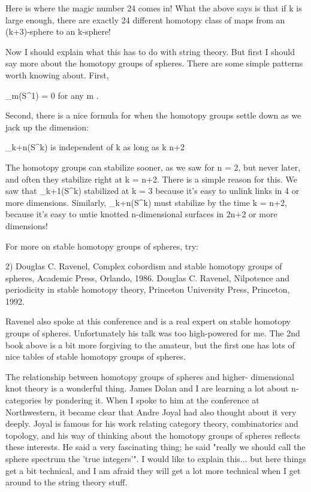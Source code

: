 Here is where the magic number 24 comes in!  What the above says
is that if k is large enough, there are exactly 24 different homotopy
class of maps from an (k+3)-sphere to an k-sphere!  

Now I should explain what this has to do with string theory.  But first
I should say more about the homotopy groups of spheres.  There are some
simple patterns worth knowing about.  First,

\pi _{m}(S^{1}) = {0}         for any m .

Second, there is a nice formula for when the homotopy groups settle
down as we jack up the dimension:

\pi _{k+n}(S^{k})   is independent of k as long as k \ge  n+2

The homotopy groups can stabilize sooner, as we saw for n = 2, but never
later, and often they stabilize right at k = n+2.  There is a simple
reason for this.  We saw that \pi _{k+1}(S^{k}) stabilized at k = 3 because
it's easy to unlink links in 4 or more dimensions.  Similarly,
\pi _{k+n}(S^{k}) must stabilize by the time k = n+2, because it's easy to
untie knotted n-dimensional surfaces in 2n+2 or more dimensions!

For more on stable homotopy groups of spheres, try:

2) Douglas C. Ravenel, Complex cobordism and stable homotopy groups of
spheres, Academic Press, Orlando, 1986. 
Douglas C. Ravenel, Nilpotence and periodicity in stable homotopy
theory, Princeton University Press, Princeton, 1992.  

Ravenel also spoke at this conference and is a real expert on stable
homotopy groups of spheres.  Unfortunately his talk was too high-powered
for me.  The 2nd book above is a bit more forgiving to the amateur,
but the first one has lots of nice tables of stable homotopy groups
of spheres.   

The relationship between homotopy groups of spheres and higher-
dimensional knot theory is a wonderful thing.  James Dolan and I are
learning a lot about n-categories by pondering it.  When I spoke to
him at the conference at Northwestern, it became clear that Andre
Joyal had also thought about it very deeply.  Joyal is famous for his
work relating category theory, combinatorics and topology, and his way
of thinking about the homotopy groups of spheres reflects these
interests.  He said a very fascinating thing; he said "really we
should call the sphere spectrum the 'true integers'".  I
would like to explain this... but here things get a bit technical, and
I am afraid they will get a lot more technical when I get around to
the string theory stuff.


